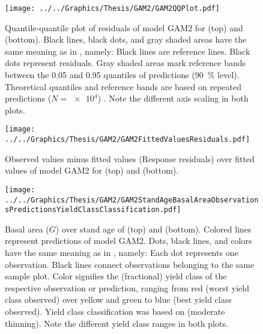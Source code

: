 \begin{figure}[h]
  \centering
  \texttt{[image: ../../Graphics/Thesis/GAM2/GAM2QQPlot.pdf]}
  \caption{Quantile-quantile plot of residuals of model GAM2 for \Beech{} (top) and \Spruce{} (bottom).  Black lines, black dots, and gray shaded areas have the same meaning as in , namely:  Black lines are reference lines.  Black dots represent residuals.  Gray shaded areas mark reference bands between the \num{0.05} and \num{0.95} quantiles of predictions (\SI{90}{\percent} level).  Theoretical quantiles and reference bands are based on repeated predictions (\(N = \num{e4}\)) \parencite{Augustin2012}.  Note the different axis scaling in both plots.}
  \label{fig:GAM2QQPlot}
\end{figure}

\begin{figure}[h]
  \centering
  \texttt{[image: ../../Graphics/Thesis/GAM2/GAM2FittedValuesResiduals.pdf]}
  \caption{Observed values minus fitted values (Response residuals) over fitted values of model GAM2 for \Beech{} (top) and \Spruce{} (bottom).}
  \label{fig:GAM2FittedValuesResiduals}
\end{figure}

\begin{figure}[h]
  \centering
  \texttt{[image: ../../Graphics/Thesis/GAM2/GAM2StandAgeBasalAreaObservationsPredictionsYieldClassClassification.pdf]}
  \caption{Basal area (\(G\)) over stand age of \Beech{} (top) and \Spruce{} (bottom).  Colored lines represent predictions of model GAM2.  Dots, black lines, and colors have the same meaning as in , namely:  Each dot represents one observation.  Black lines connect observations belonging to the same sample plot.  Color signifies the (fractional) yield class of the respective observation or prediction, ranging from red (worst yield class observed) over yellow and green to blue (best yield class observed). Yield class classification was based on \textcite{Schober1995} (moderate thinning).  Note the different yield class ranges in both plots.}
  \label{fig:GAM2StandAgeBasalAreaObservationsPredictionsYieldClassClassification}
\end{figure}

